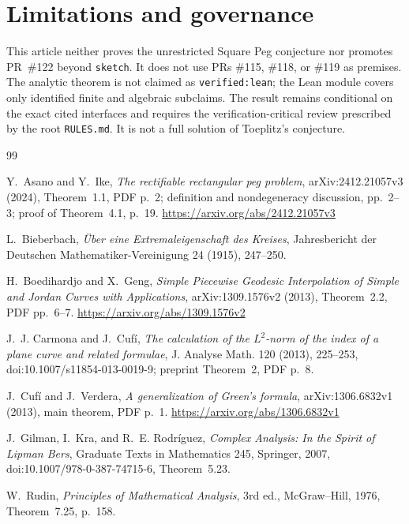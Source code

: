 \documentclass[11pt]{article}
\theoremstyle{definition}
\theoremstyle{remark}
\begin{document}
\section{Limitations and governance}

This article neither proves the unrestricted Square Peg conjecture nor
promotes PR~\#122 beyond \texttt{sketch}.  It does not use PRs \#115,
\#118, or \#119 as premises.  The analytic theorem is not claimed as
\texttt{verified:lean}; the Lean module covers only identified finite and
algebraic subclaims.  The result remains conditional on the exact cited
interfaces and requires the verification-critical review prescribed by the
root \texttt{RULES.md}.  It is not a full solution of Toeplitz's conjecture.

\begin{thebibliography}{99}

Y.~Asano and Y.~Ike,
\emph{The rectifiable rectangular peg problem},
arXiv:2412.21057v3 (2024), Theorem~1.1, PDF p.~2; definition and
nondegeneracy discussion, pp.~2--3; proof of Theorem~4.1, p.~19.
\url{https://arxiv.org/abs/2412.21057v3}

L.~Bieberbach,
\emph{\"Uber eine Extremaleigenschaft des Kreises},
Jahresbericht der Deutschen Mathematiker-Vereinigung 24 (1915), 247--250.

H.~Boedihardjo and X.~Geng,
\emph{Simple Piecewise Geodesic Interpolation of Simple and Jordan Curves
with Applications},
arXiv:1309.1576v2 (2013), Theorem~2.2, PDF pp.~6--7.
\url{https://arxiv.org/abs/1309.1576v2}

J.~J. Carmona and J.~Cuf\'i,
\emph{The calculation of the $L^2$-norm of the index of a plane curve and
related formulae}, J. Analyse Math. 120 (2013), 225--253,
doi:10.1007/s11854-013-0019-9; preprint Theorem~2, PDF p.~8.

J.~Cuf\'i and J.~Verdera,
\emph{A generalization of Green's formula},
arXiv:1306.6832v1 (2013), main theorem, PDF p.~1.
\url{https://arxiv.org/abs/1306.6832v1}

J.~Gilman, I.~Kra, and R.~E. Rodr\'iguez,
\emph{Complex Analysis: In the Spirit of Lipman Bers},
Graduate Texts in Mathematics 245, Springer, 2007,
doi:10.1007/978-0-387-74715-6, Theorem~5.23.

W.~Rudin, \emph{Principles of Mathematical Analysis}, 3rd ed.,
McGraw--Hill, 1976, Theorem~7.25, p.~158.

\end{thebibliography}
\end{document}
